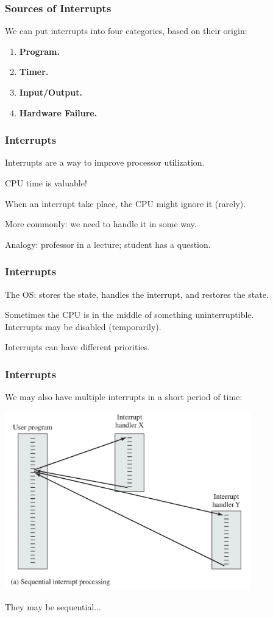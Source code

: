 \begin{frame}
	\frametitle{Sources of Interrupts}

	We can put interrupts into four categories, based on their origin:

	\begin{enumerate}
		\item \textbf{Program.}
		\item \textbf{Timer.}
		\item \textbf{Input/Output.}
		\item \textbf{Hardware Failure.}
	\end{enumerate}


\end{frame}

\begin{frame}
	\frametitle{Interrupts}
	Interrupts are a way to improve processor utilization.

	CPU time is valuable!

	When an interrupt take place, the CPU might ignore it (rarely).

	More commonly: we need to \alert{handle} it in some way.

	Analogy: professor in a lecture; student has a question.


\end{frame}

\begin{frame}
	\frametitle{Interrupts}
	The OS: stores the state, handles the interrupt, and restores the state.

	Sometimes the CPU is in the middle of something uninterruptible.\\
	\quad Interrupts may be disabled (temporarily).

	Interrupts can have different priorities.
\end{frame}

\begin{frame}
	\frametitle{Interrupts}

	We may also have multiple interrupts in a short period of time:

	\begin{center}
		\includegraphics[width=0.8\textwidth]{images/interrupts-seq.png}
	\end{center}

	They may be sequential...

\end{frame}

